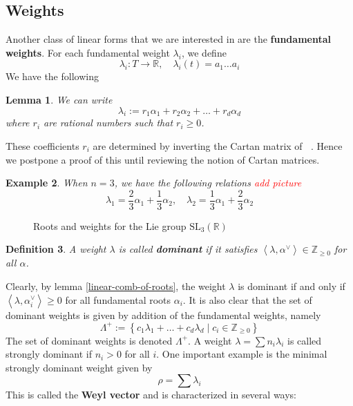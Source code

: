 \documentclass[12pt]{article} %
\newtheorem{definition}{Definition}[section]
\newtheorem{lemma}[definition]{Lemma}
\newtheorem{example}[definition]{Example}
\DeclareMathOperator{\slnr}{\mathfrak{sl}_n(\mathbb{R})}
\begin{document}
\subsection{Weights}
Another class of linear forms that we are interested in are the \textbf{fundamental weights}. For each fundamental
weight $\lambda_i$, we define
\[\lambda_i \colon T \to \mathbb{R}, \quad\lambda_i(t) = a_1\ldots a_i\]
We have the following
\begin{lemma}\label{linear-comb-of-weights}
    We can write
    \[\lambda_i := r_1\alpha_1 + r_2\alpha_2+\ldots + r_d\alpha_d\]
    where $r_i$ are rational numbers such that $r_i \ge 0$.
\end{lemma}
These coefficients $r_i$ are determined by inverting the Cartan matrix of $\slnr$. Hence we postpone a proof
of this until reviewing the notion of Cartan matrices.
\begin{example}
    When $n=3$, we have the following relations \textcolor{red}{add picture}
    \[\lambda_1 = \dfrac{2}{3}\alpha_1+\dfrac{1}{3}\alpha_2, \quad \lambda_2 = \dfrac{1}{3}\alpha_1+\dfrac{2}{3}\alpha_2\]
\end{example}
\begin{figure}[h]
    \centering
\caption{Roots and weights for the Lie group $\text{SL}_3(\mathbb{R})$}
\end{figure}


\begin{definition}
    A weight $\lambda$ is called \textbf{dominant} if it satisfies $\left\langle \lambda,\alpha^{\vee} \right\rangle \in \mathbb{Z}_{\ge 0}$ for all $\alpha$.
\end{definition}
Clearly, by lemma \ref{linear-comb-of-roots}, the weight $\lambda$ is dominant if and only if $\left\langle\lambda,\alpha_i^\vee\right\rangle \ge 0$ for all
fundamental roots $\alpha_i$. It is also clear that the set of dominant weights is given by addition of the fundamental weights, namely
\[\Lambda^+ := \left\lbrace c_1\lambda_1+\ldots+c_d\lambda_d \mid c_i \in \mathbb{Z}_{\ge 0}\right\rbrace\]
The set of dominant weights is denoted $\Lambda^+$. A weight $\lambda = \sum n_i \lambda_i$ is called strongly dominant if $n_i > 0$ for all $i$. One important example is the minimal strongly dominant weight given by
\[
    \rho = \sum \lambda_i
\]
This is called the \textbf{Weyl vector} and is characterized in several ways:
\end{document}
